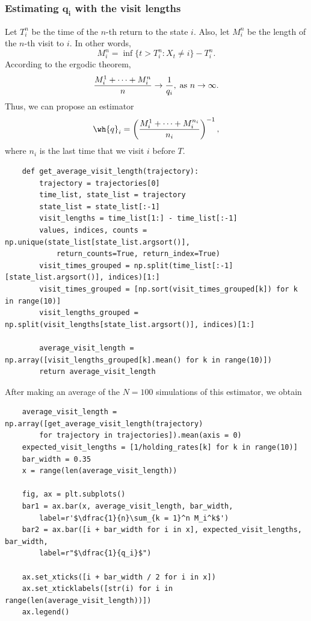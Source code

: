 \subsubsection*{Estimating $\boldsymbol{q_i}$ with the visit lengths}

Let $T^n_i$ be the time of the $n$-th return to the state $i$. Also, let $M^n_i$ be the length of the $n$-th visit to $i$. In other words,
\[ M^n_i = \inf\{t > T^n_i : X_t \neq i\} - T^n_i. \]
According to the ergodic theorem,
\[\frac{M^1_i + \cdots + M^n_i}{n} \to \frac{1}{q_i},\; \hbox{as }n\to\infty. \]
Thus, we can propose an estimator
\[ \wh{q}_i = \left( \frac{M^1_i + \cdots + M^{n_i}_i}{n_i} \right)^{-1}, \]
where $n_i$ is the last time that we visit $i$ before $T$.

\begin{verbatim}
    def get_average_visit_length(trajectory):
        trajectory = trajectories[0]
        time_list, state_list = trajectory
        state_list = state_list[:-1]
        visit_lengths = time_list[1:] - time_list[:-1]
        values, indices, counts = np.unique(state_list[state_list.argsort()], 
            return_counts=True, return_index=True)
        visit_times_grouped = np.split(time_list[:-1][state_list.argsort()], indices)[1:] 
        visit_times_grouped = [np.sort(visit_times_grouped[k]) for k in range(10)]
        visit_lengths_grouped = np.split(visit_lengths[state_list.argsort()], indices)[1:] 

        average_visit_length = np.array([visit_lengths_grouped[k].mean() for k in range(10)])
        return average_visit_length
\end{verbatim}

After making an average of the $N = 100$ simulations of this estimator, we obtain

\begin{verbatim}
    average_visit_length = np.array([get_average_visit_length(trajectory) 
        for trajectory in trajectories]).mean(axis = 0)
    expected_visit_lengths = [1/holding_rates[k] for k in range(10)]
    bar_width = 0.35
    x = range(len(average_visit_length))

    fig, ax = plt.subplots()
    bar1 = ax.bar(x, average_visit_length, bar_width, 
        label=r'$\dfrac{1}{n}\sum_{k = 1}^n M_i^k$')
    bar2 = ax.bar([i + bar_width for i in x], expected_visit_lengths, bar_width,
        label=r"$\dfrac{1}{q_i}$")

    ax.set_xticks([i + bar_width / 2 for i in x])
    ax.set_xticklabels([str(i) for i in range(len(average_visit_length))])
    ax.legend()
\end{verbatim}

